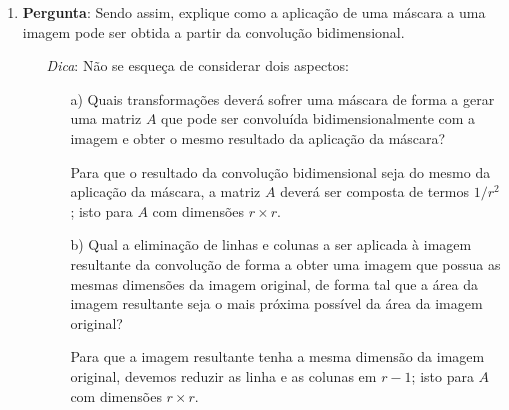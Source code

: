 \documentclass[11pt]{article}
\begin{document}
\begin{enumerate}
\item \textbf{Pergunta}: Sendo assim, explique como a aplicação de uma máscara a uma imagem pode ser obtida a partir da convolução bidimensional. 

\begin{itemize}
\item[\textit{Dica}:] Não se esqueça de considerar dois aspectos:

\begin{itemize}
\item[a)] Quais transformações deverá sofrer uma máscara de forma a gerar uma matriz $A$ que pode ser convoluída bidimensionalmente com a imagem e obter o mesmo resultado da aplicação da máscara?

Para que o resultado da convolução bidimensional seja do mesmo da aplicação da máscara, a matriz $A$ deverá ser composta de termos $1/r^2$; isto para $A$ com dimensões $r \times r$.

\item[b)] Qual a eliminação de linhas e colunas a ser aplicada à imagem resultante da convolução de forma a obter uma imagem que possua as mesmas dimensões da imagem original, de forma tal que a área da imagem resultante seja o mais próxima possível da área da imagem original?

Para que a imagem resultante tenha a mesma dimensão da imagem original, devemos reduzir as linha e as colunas em $r-1$; isto para $A$ com dimensões $r \times r$.
\end{itemize}
\end{itemize}

\end{enumerate}
\end{document}
